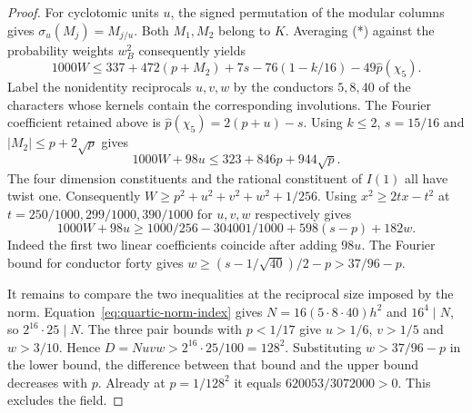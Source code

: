 \documentclass[11pt,a4paper]{article}
\numberwithin{equation}{section}
\begin{document}
\begin{proof}
For cyclotomic units $u$, the signed permutation of the modular
columns gives $\sigma_u(M_j)=M_{j/u}$. Both $M_1,M_2$ belong to $K$.
Averaging (*) against the probability weights $w_B^2$ consequently yields
\[
 1000 W\le337+472(p+M_2)+7s
        -76(1-k/16)-49\widehat p(\chi_5).
\]
Label the nonidentity reciprocals $u,v,w$ by the conductors $5,8,40$ of the characters whose kernels contain the corresponding involutions. The Fourier coefficient retained above is $\widehat p(\chi_5)=2(p+u)-s$. Using $k\le2$, $s=15/16$ and $|M_2|\le p+2\sqrt p$ gives
\[
                  1000W+98u\le323+846p+944\sqrt p .
\]
The four dimension constituents and the rational constituent of $I(1)$ all have twist one. Consequently $W\ge p^2+u^2+v^2+w^2+1/256$. Using $x^2\ge2tx-t^2$ at $t=250/1000,299/1000,390/1000$ for $u,v,w$ respectively gives
\[
  1000W+98u\ge 1000/256-304001/1000+598(s-p)+182w .
\]
Indeed the first two linear coefficients coincide after adding $98u$. The Fourier bound for conductor forty gives $w\ge(s-1/\sqrt{40})/2-p>37/96-p$.

It remains to compare the two inequalities at the reciprocal size imposed by the norm. Equation~\eqref{eq:quartic-norm-index} gives $N=16(5\cdot8\cdot40)h^2$ and $16^4\mid N$, so $2^{16}\cdot25\mid N$. The three pair bounds with $p<1/17$ give $u>1/6$, $v>1/5$ and $w>3/10$. Hence $D=Nuvw>2^{16}\cdot25/100=128^2$. Substituting $w>37/96-p$ in the lower bound, the difference between that bound and the upper bound decreases with $p$. Already at $p=1/128^2$ it equals $620053/3072000>0$. This excludes the field.
\end{proof}
\end{document}
